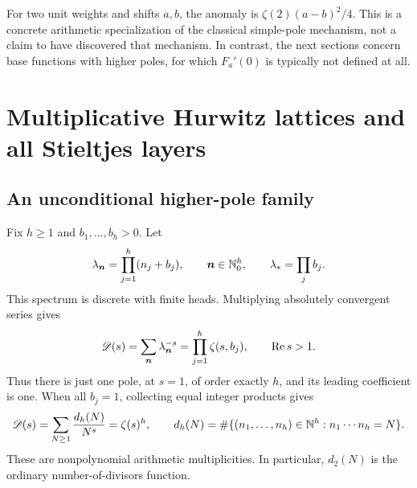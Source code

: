 \documentclass[11pt]{article}
\numberwithin{equation}{section}
\theoremstyle{definition}\newtheorem{definition}[theorem]{Definition}
\theoremstyle{remark}\newtheorem{remark}[theorem]{Remark}\newtheorem{example}[theorem]{Example}
\newcommand{\D}{\mathscr D}\newcommand{\calH}{\mathcal H}\newcommand{\calR}{\mathcal R}
\begin{document}
For two unit weights and shifts $a,b$, the anomaly is
$\zeta(2)(a-b)^2/4$. This is a concrete arithmetic specialization of the
classical simple-pole mechanism, not a claim to have discovered that
mechanism. In contrast, the next sections concern base functions with
higher poles, for which $F_a'(0)$ is typically not defined at all.



\section{Multiplicative Hurwitz lattices and all Stieltjes layers}
\label{asj:sec:hurwitz}

\subsection{An unconditional higher-pole family}
Fix $h\ge1$ and $b_1,\ldots,b_h>0$. Let
\begin{equation}\label{asj:eq:lattice}
 \lambda_{\boldsymbol n}=\prod_{j=1}^h(n_j+b_j),
 \qquad \boldsymbol n\in\mathbb N_0^h,
 \qquad \lambda_* =\prod_jb_j.
\end{equation}
This spectrum is discrete with finite heads. Multiplying absolutely
convergent series gives
\begin{equation}\label{asj:eq:Dhurwitz}
 \D(s)=\sum_{\boldsymbol n}\lambda_{\boldsymbol n}^{-s}
              =\prod_{j=1}^h\zeta(s,b_j),\qquad \Rea s>1.
\end{equation}
Thus there is just one pole, at $s=1$, of order exactly $h$, and its
leading coefficient is one. When all $b_j=1$, collecting equal integer
products gives
\[
 \D(s)=\sum_{N\ge1}\frac{d_h(N)}{N^s}=\zeta(s)^h,
 \qquad d_h(N)=\#\{(n_1,\ldots,n_h)\in\N^h:n_1\cdots n_h=N\}.
\]
These are nonpolynomial arithmetic multiplicities. In particular,
$d_2(N)$ is the ordinary number-of-divisors function.
\end{document}
